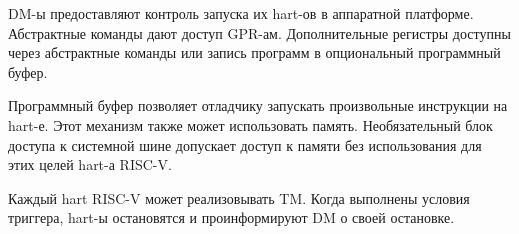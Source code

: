 DM-ы предоставляют контроль запуска их hart-ов в аппаратной платформе. Абстрактные команды
дают доступ GPR-ам. Дополнительные регистры доступны через абстрактные команды или запись
программ в опциональный программный буфер.

Программный буфер позволяет отладчику запускать произвольные инструкции на
hart-е. Этот механизм также может использовать память. Необязательный блок доступа
к системной шине допускает доступ к памяти без использования для этих целей hart-а RISC-V.

Каждый hart RISC-V может реализовывать TM. Когда выполнены условия триггера,
hart-ы остановятся и проинформируют DM о своей остановке.
